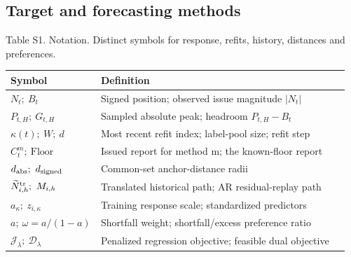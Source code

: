 \documentclass[11pt,a4paper]{article}
\begin{document}
\subsection*{Target and forecasting methods}
\begingroup\footnotesize
\begin{samepage}Table S1. Notation. Distinct symbols for response, refits, history, distances and preferences.\end{samepage}
\begin{longtable}{>{\raggedright\arraybackslash}p{0.230\linewidth}>{\raggedright\arraybackslash}p{0.730\linewidth}}
\toprule
Symbol & Definition \\
\midrule
\endhead
\(N_t;\ B_t\) & Signed position; observed issue magnitude \(|N_t|\) \\
\(P_{t,H};\ G_{t,H}\) & Sampled absolute peak; headroom \(P_{t,H}-B_t\) \\
\(\kappa(t);\ W;\ d\) & Most recent refit index; label-pool size; refit step \\
\(C_t^m;\ \mathrm{Floor}\) & Issued report for method m; the known-floor report \\
\(d_{\rm abs};\ d_{\rm signed}\) & Common-set anchor-distance radii \\
\(\widetilde N_{i,h}^{\rm tr};\ M_{i,h}\) & Translated historical path; AR residual-replay path \\
\(a_\kappa;\ z_{i,\kappa}\) & Training response scale; standardized predictors \\
\(a;\ \omega=a/(1-a)\) & Shortfall weight; shortfall/excess preference ratio \\
\(\mathcal J_\lambda;\ \mathcal D_\lambda\) & Penalized regression objective; feasible dual objective \\
\bottomrule
\end{longtable}
\endgroup
\end{document}
